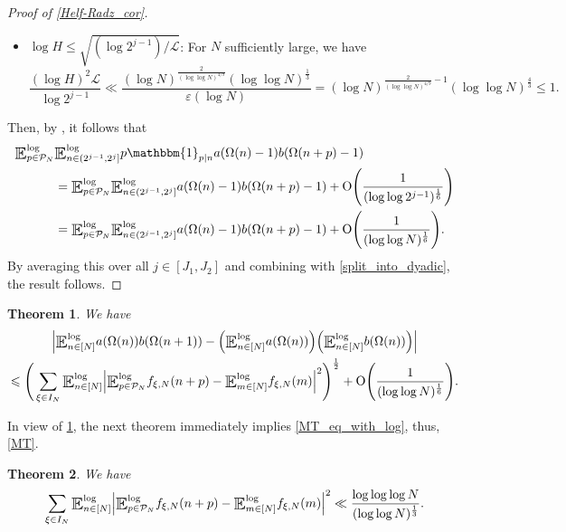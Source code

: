 \documentclass[letter,11pt]{article}
\theoremstyle{plain} %
\newtheorem{theorem}{Theorem}[section]
\theoremstyle{definition} %
\theoremstyle{plain}
\theoremstyle{plain}
\theoremstyle{plain}
\numberwithin{equation}{section}
\newcommand{\Oh}{{\mathrm O}}
\renewcommand{\epsilon}{\varepsilon}
\renewcommand{\leq}{\leqslant}
\newcommand{\E}{\raisebox{-0.4ex}{\scalebox{1.4}[1.3]{$\mathbb{E}$}}}
\newcommand{\logE}{{\E}^{\log}}
\newcommand{\1}{\mathbbm{1}}
\newcommand{\f}{f_{\xi,N}}
\newcommand{\Pc}{\mathcal{P}}
\begin{document}
\begin{proof}[Proof of \cref{Helf-Radz_cor}]
\begin{itemize}
        For $N$ sufficiently large, we have
        $$\frac{(\log{H})^\frac{2}{3}(\log\log{H})^2}{\log{H_0}}
        \leq \frac{(\log{H})^\frac{3}{4}}{\log{H_0}}
        = \frac{\exp\big((\log\log{N})^\frac{1}{3}\big)}{(\log{N})^\frac{1}{4(\log\log{N})^{4/9}}}\leq 1.$$
        \item $\log{H}\leq \sqrt{(\log{2^{j-1}})/\mathscr{L}}$:
        For $N$ sufficiently large, we have
        $$\frac{(\log{H})^2\mathscr{L}}{\log{2^{j-1}}} 
        \ll \frac{(\log{N})^\frac{2}{(\log\log{N})^{4/9}}(\log\log{N})^\frac{1}{3}}{\epsilon(\log{N})}
        = (\log{N})^{\frac{2}{(\log\log{N})^{4/9}}-1}(\log\log{N})^\frac{4}{3}
        \leq 1.$$
    \end{itemize}
    Then, by \cite[Corollary 1.4]{helf_radz}, it follows that 
    \begin{align*}
        \logE_{p\in\Pc_N} & \logE_{n\in(2^{j-1},2^j]}p\1_{p\mid n}a(\Omega(n)-1)b(\Omega(n+p)-1) \\
        & = \logE_{p\in\Pc_N}\logE_{n\in(2^{j-1},2^j]}a(\Omega(n)-1)b(\Omega(n+p)-1) + \Oh\Bigg(\frac{1}{(\log\log{2^{j-1}})^\frac{1}{6}}\Bigg) \\
        & = \logE_{p\in\Pc_N}\logE_{n\in(2^{j-1},2^j]}a(\Omega(n)-1)b(\Omega(n+p)-1) + \Oh\Bigg(\frac{1}{(\log\log{N})^\frac{1}{6}}\Bigg).
    \end{align*}
    By averaging this over all $j\in[J_1,J_2]$ and combining with \eqref{split_into_dyadic}, the result follows.    
\end{proof}

\begin{theorem}\label{reducing_MT}
We have
\begin{multline*}
    \Big|\logE_{n\in[N]}a(\Omega(n))b(\Omega(n+1)) - \Big(\logE_{n\in[N]}a(\Omega(n))\Big)\Big(\logE_{n\in[N]}b(\Omega(n))\Big)\Big| \\
    \leq \Bigg(\sum_{\xi\in I_N}\logE_{n\in[N]}\Big|\logE_{p\in\Pc_N} \f(n+p) - \logE_{m\in[N]}\f(m)\Big|^2\Bigg)^\frac{1}{2} + \Oh\Bigg(\frac{1}{(\log\log{N})^\frac{1}{6}}\Bigg).
\end{multline*}
\end{theorem}

In view of \cref{reducing_MT}, the next theorem immediately implies \eqref{MT_eq_with_log}, thus, \cref{MT}.

\begin{theorem}\label{MT_reduced}
We have
\begin{equation}\label{MT_reduced_eq}
    \sum_{\xi\in I_N}\logE_{n\in[N]}\Big|\logE_{p\in\Pc_N} \f(n+p) - \logE_{m\in[N]}\f(m)\Big|^2
    \ll
    \frac{\log\log\log{N}}{(\log\log{N})^\frac{1}{3}}.
\end{equation}
\end{theorem}
\end{document}
